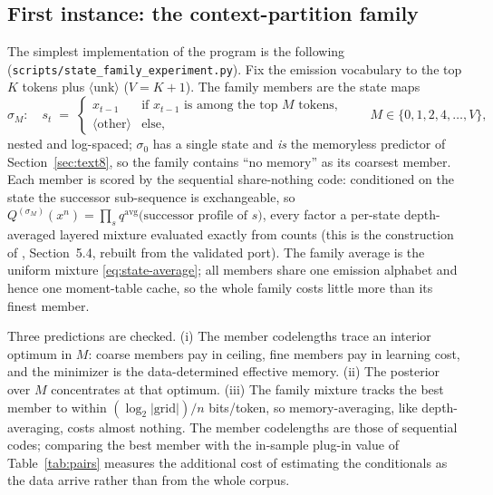 \documentclass[11pt]{article}
\begin{document}
\subsection{First instance: the context-partition family}
\label{sec:state-family}

The simplest implementation of the program is the following
(\texttt{scripts/state\_family\_experiment.py}).  Fix the emission
vocabulary to the top $K$ tokens plus $\langle\mathrm{unk}\rangle$
($V=K{+}1$).  The family members are the state maps
\[
  \sigma_M:\quad
  s_t \;=\;
  \begin{cases}
    x_{t-1} & \text{if } x_{t-1} \text{ is among the top } M
      \text{ tokens},\\
    \langle\mathrm{other}\rangle & \text{else},
  \end{cases}
  \qquad M \in \{0, 1, 2, 4, \dots, V\},
\]
nested and log-spaced; $\sigma_0$ has a single state and \emph{is} the
memoryless predictor of Section~\ref{sec:text8}, so the family contains
``no memory'' as its coarsest member.  Each member is scored by the
sequential share-nothing code: conditioned on the state the successor
sub-sequence is exchangeable, so
$Q^{(\sigma_M)}(x^n)=\prod_{s} q^{\mathrm{avg}}\bigl(\text{successor
profile of } s\bigr)$, every factor a per-state depth-averaged layered
mixture evaluated exactly from counts (this is the construction of
\cite{layered2026}, Section~5.4, rebuilt from the validated port).  The
family average is the uniform mixture \eqref{eq:state-average}; all
members share one emission alphabet and hence one moment-table cache, so
the whole family costs little more than its finest member.

Three predictions are checked.  (i) The member codelengths trace an
interior optimum in $M$: coarse members pay in ceiling, fine members pay
in learning cost, and the minimizer is the data-determined effective
memory.  (ii) The posterior over $M$ concentrates at that optimum.
(iii) The family mixture tracks the best member to within
$(\log_2 |\mathrm{grid}|)/n$ bits/token, so memory-averaging, like
depth-averaging, costs almost nothing.  The member codelengths are those
of sequential codes; comparing the best member with the in-sample
plug-in value of Table~\ref{tab:pairs} measures the additional cost of
estimating the conditionals as the data arrive rather than from the
whole corpus.
\end{document}
